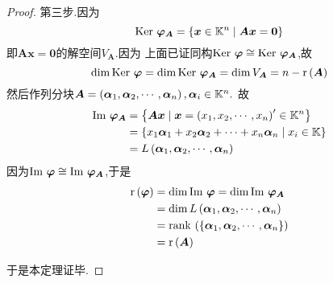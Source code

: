 {\begin{proof}
        第三步.因为
        \[
            \operatorname{Ker\,} \bm{\varphi}_{\bm{A}}
            =\left\{\bm{x}\in \mathbb{K} ^n\mid\bm{Ax}=\bm{0}
            \right\}
        \]
        即$\bm{Ax}=\bm{0}$的解空间$V_{\bm{A}}$.因为
        上面已证同构$\operatorname{Ker\,} \bm{\varphi}\cong \operatorname{Ker\,} \bm{\varphi}_{\bm{A}}$,故
        \[
            \dim\operatorname{Ker\,} \bm{\varphi}=\dim\operatorname{Ker\,} \bm{\varphi}_{\bm{A}}=\dim V_{\bm{A}}=n-\mathrm{r} \left(\bm{A}
            \right)
        \]
        然后作列分块$\bm{A}=\left(\bm{\alpha}_1,\bm{\alpha}_2,\cdots,\bm{\alpha}_n\right),\bm{\alpha}_i\in \mathbb{K} ^n.$
        故
        \begin{align*}
            \operatorname{Im\,}\bm{\varphi}_{\bm{A}} & =\left\{
            \bm{Ax}\mid\bm{x}=\left(x_1,x_2,\cdots,x_n\right)'\in \mathbb{K} ^n
            \right\}                                                                                      \\
                                        & =\left\{x_1\bm{\alpha}_1+x_2\bm{\alpha}_2+\cdots+
            x_n\bm{\alpha}_n\mid x_i\in \mathbb{K} \right\}                                                     \\
                                        & =L\left(\bm{\alpha}_1,\bm{\alpha}_2,\cdots,\bm{\alpha}_n\right)
        \end{align*}
        因为$\operatorname{Im\,}\bm{\varphi}\cong \operatorname{Im\,}\bm{\varphi}_{\bm{A}}$,于是
        \begin{align*}
            \mathrm{r} \left(\bm{\varphi}\right) & =\dim\operatorname{Im\,}\bm{\varphi}=\dim\operatorname{Im\,}\bm{\varphi}_{\bm{A}}                             \\
                                           & =\dim L\left(\bm{\alpha}_1,\bm{\alpha}_2,\cdots,\bm{\alpha}_n\right)
            \\
                                           & =\operatorname{rank\,} \left(\left\{\bm{\alpha}_1,\bm{\alpha}_2,\cdots,\bm{\alpha}_n\right\}\right) \\
                                           & =\mathrm{r} \left(\bm{A}\right)
        \end{align*}

        于是本定理证毕.
    \end{proof}
}
